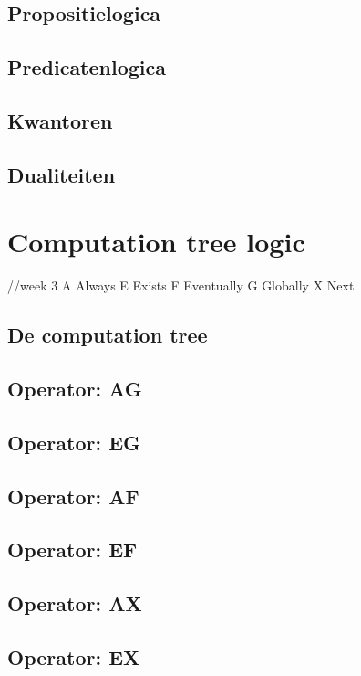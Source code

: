 \documentclass{article}
\begin{document}
\subsection{Propositielogica}

\subsection{Predicatenlogica}

\subsection{Kwantoren}

\subsection{Dualiteiten}

\section{Computation tree logic}
//week 3
A Always E Exists F Eventually G Globally X Next

\subsection{De computation tree}

\subsection{Operator: AG}

\subsection{Operator: EG}

\subsection{Operator: AF}

\subsection{Operator: EF}

\subsection{Operator: AX}

\subsection{Operator: EX}
\end{document}
